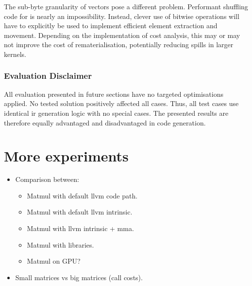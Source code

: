 \documentclass[\main/thesis.tex]{subfiles}
\begin{document}
The sub-byte granularity of  vectors pose a different problem.
Performant shuffling code for  is nearly an impossibility.
Instead, clever use of bitwise operations will have to explicitly be used to implement efficient element extraction and movement.
Depending on the implementation of cost analysis, this may or may not improve the cost of \gls{rematerialisation}, potentially reducing spills in larger kernels.

\subsubsection{Evaluation Disclaimer}
All evaluation presented in future sections have no targeted optimisations applied.
No tested solution positively affected all cases.
Thus, all test cases use identical \gls{ir} generation logic with no special cases.
The presented results are therefore equally advantaged and disadvantaged in code generation.

\section{More experiments}
\begin{itemize}
  \item Comparison between:
  \begin{itemize}
    \item Matmul with default llvm code path.
    \item Matmul with default llvm intrinsic.
    \item Matmul with llvm intrinsic + mma.
    \item Matmul with libraries.
    \item Matmul on GPU?
  \end{itemize}
\end{itemize}

\begin{itemize}
  \item Small matrices vs big matrices (call costs).
\end{itemize}
\end{document}
